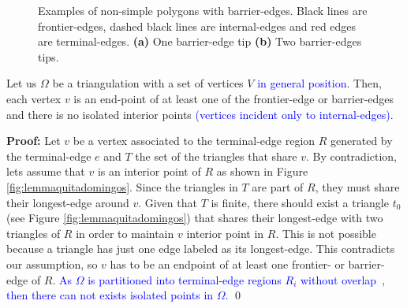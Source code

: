 \begin{figure}[h]
\centering  
{}\hspace{2cm}
\hspace{0.5cm}

\caption{Examples of non-simple polygons with barrier-edges. Black lines are frontier-edges, dashed black lines are internal-edges and red edges are terminal-edges. \textbf{(a)} One barrier-edge tip \textbf{(b)} Two barrier-edges tips. }
\label{figs:kindofbarrieredges} 
\end{figure}






\begin{lemma}\label{l:verticeslemma}
Let us  $\Omega$ be a triangulation with a set of vertices $V$ \textcolor{blue}{in general position}. Then, each vertex $v$ is an end-point of at least one  of  the  frontier-edge or barrier-edges and  there is no isolated interior points \textcolor{blue}{(vertices incident only to internal-edges)}.
\end{lemma}

\textbf{Proof:} Let $v$ be  a vertex  associated to the terminal-edge region $R$ generated by the terminal-edge $e$ and  $T$ the set of the triangles that share $v$. By contradiction, lets assume that $v$ is an interior point of $R$ as shown  in Figure \ref{fig:lemmaquitadomingos}. Since the triangles in $T$ are part of $R$, they must share their longest-edge around $v$. 
Given that $T$ is finite, there should exist a triangle $t_0$ (see Figure \ref{fig:lemmaquitadomingos}) that shares their longest-edge with two triangles of $R$ in order to maintain $v$ interior point in $R$. This is not possible because a triangle has just one edge labeled as its  longest-edge. This contradicts our assumption, so $v$ has to be an endpoint of  at least one frontier- or barrier-edge of $R$. \textcolor{blue}{ As $\Omega$ is partitioned into terminal-edge regions $R_i$ without overlap~\cite{Ojeda2018ANA}, then there can not exists isolated points in $\Omega$.} \qed

